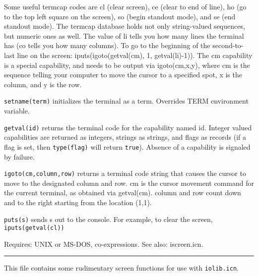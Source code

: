 Some useful termcap codes are {\textquotedbl}cl{\textquotedbl} (clear
screen), {\textquotedbl}ce{\textquotedbl} (clear to end of line),
{\textquotedbl}ho{\textquotedbl} (go to the top left square on the
screen), {\textquotedbl}so{\textquotedbl} (begin standout mode), and
{\textquotedbl}se{\textquotedbl} (end standout mode). The termcap
database holds not only string-valued sequences, but numeric ones as
well. The value of {\textquotedbl}li{\textquotedbl} tells you how many
lines the terminal has ({\textquotedbl}co{\textquotedbl} tells you how
many columns). To go to the beginning of the second-to-last line on the
screen: iputs(igoto(getval({\textquotedbl}cm{\textquotedbl}), 1,
getval({\textquotedbl}li{\textquotedbl})-1)). The
{\textquotedbl}cm{\textquotedbl} capability is a special capability,
and needs to be output via igoto(cm,x,y), where cm is the sequence
telling your computer to move the cursor to a specified spot, x is the
column, and y is the row.

\texttt{setname(term)} initializes the terminal as a term. Overrides
TERM environment variable.

\texttt{getval(id)} returns the terminal code for the capability named
id. Integer valued capabilities are returned as integers, strings as
strings, and flags as records (if a flag is set, then
\texttt{type(flag)} will return
\texttt{{\textquotedbl}true{\textquotedbl}}). Absence of a capability
is signaled by failure.

\texttt{igoto(cm,column,row)} returns a terminal code string that causes
the cursor to move to the designated column and row. cm is the cursor
movement command for the current terminal, as obtained via
getval({\textquotedbl}cm{\textquotedbl}). column and row count down and
to the right starting from the location (1,1).

\texttt{puts(s)} sends s out to the console. For example, to clear the
screen, \texttt{iputs(getval({\textquotedbl}cl{\textquotedbl}))}

Requires: UNIX or MS-DOS, co-expressions. See also: iscreen.icn.

\vspace{0.25cm}\hrule{}

This file contains some rudimentary screen functions for use with
\texttt{iolib.icn}.

